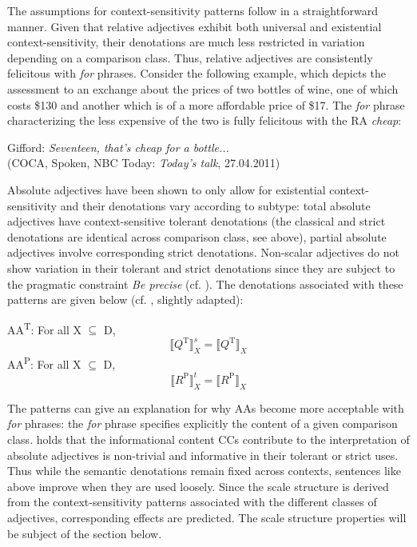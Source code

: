 \documentclass[output=paper]{langsci/langscibook}
\begin{document}
The assumptions for context-sensitivity patterns follow in a straightforward manner. Given that relative adjectives exhibit both universal and existential con\-text-sensitivity, their denotations are much less restricted in variation depending on a comparison class. Thus, relative adjectives are consistently felicitous with \textit{for} phrases. Consider the following example, which depicts the assessment to an exchange about the prices of two bottles of wine, one of which costs \$130 and another which is of a more affordable price of \$17. The  \textit{for} phrase characterizing the less expensive of the two is fully felicitous with the RA  \textit{cheap}:

\ea
	Gifford: \textit{Seventeen, that's cheap for a bottle...} \\ (COCA, Spoken, NBC Today: \textit{Today's talk}, 27.04.2011)
\z

Absolute adjectives have been shown to only allow for existential context-sensitivity and their denotations vary according to subtype: total absolute adjectives have context-sensitive tolerant denotations (the classical and strict denotations are identical across comparison class, see above), partial absolute adjectives involve corresponding strict denotations. Non-scalar adjectives do not show variation in their tolerant and strict denotations since they are subject to the pragmatic constraint \textit{Be precise} (cf. \citealt[85]{Burnett2017}). The denotations associated with these patterns are given below (cf. \citealt[85]{Burnett2017}, slightly adapted):

\ea
	AA\textsuperscript{T}: For all X $\subseteq$ D, \[ \llbracket Q^{\text{T}} \rrbracket_X^s = \llbracket Q^{\text{T}}\rrbracket_{X}\]
\ex
	AA\textsuperscript{P}: For all X $\subseteq$ D, \[\llbracket R^{\text{P}}\rrbracket_X^t = \llbracket R^{\text{P}}\rrbracket_{X}\]
\z

The patterns can give an explanation for why AAs become more acceptable with  \textit{for} phrases: the \textit{for} phrase specifies explicitly the content of a given comparison class. \textcite[86]{Burnett2017} holds that the informational content CCs contribute to the interpretation of absolute adjectives is non-trivial and informative in their tolerant or strict uses. Thus while the semantic denotations remain fixed across contexts, sentences like  above improve when they are used loosely.
Since the scale structure is derived from the context-sensitivity patterns associated with the different classes of adjectives, corresponding effects are predicted. The scale structure properties will be subject of the section below.
\end{document}
